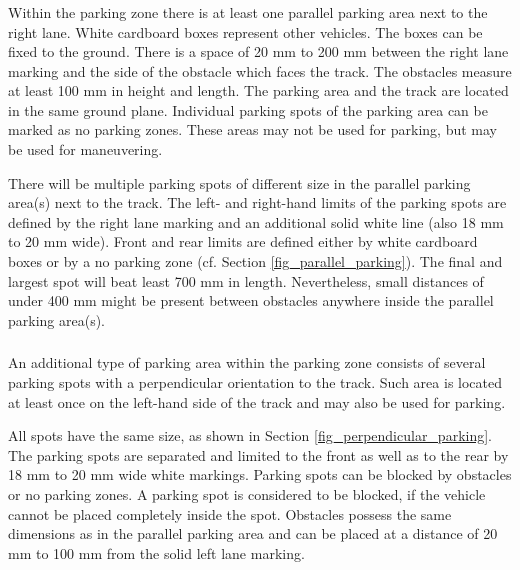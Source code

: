 \subsubsection{}

Within the parking zone there is at least one parallel parking area next to the
right lane. White cardboard boxes represent other vehicles. The boxes can be
fixed to the ground. There is a space of 20 mm to 200 mm between the right lane
marking and the side of the obstacle which faces the track. The obstacles
measure at least 100 mm in height and length. The parking area and the track
are located in the same ground plane. Individual parking spots of the parking
area can be marked as no parking zones. These areas may not be used for
parking, but may be used for maneuvering.

There will be multiple parking spots of different size in the parallel parking
area(s) next to the track. The left- and right-hand limits of the parking spots
are defined by the right lane marking and an additional solid white line (also
18 mm to 20 mm wide). Front and rear limits are defined either by white
cardboard boxes or by a no parking zone (cf. Section
\ref{fig_parallel_parking}).  The final and largest spot will beat least 700
mm in length. Nevertheless, small distances of under 400 mm might be present
between obstacles anywhere inside the parallel parking area(s).

\subsubsection{}

An additional type of parking area within the parking zone consists of several
parking spots with a perpendicular orientation to the track. Such area is
located at least once on the left-hand side of the track and may also be used
for parking.

All spots have the same size, as shown in Section
\ref{fig_perpendicular_parking}. The parking spots are separated and limited to
the front as well as to the rear by 18 mm to 20 mm wide white markings. Parking
spots can be blocked by obstacles or no parking zones. A parking spot is
considered to be blocked, if the vehicle cannot be placed completely inside the
spot. Obstacles possess the same dimensions as in the parallel parking area and
can be placed at a distance of 20 mm to 100 mm from the solid left lane
marking.

